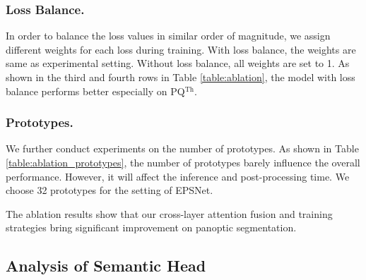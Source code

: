 \documentclass[runningheads]{llncs}
\begin{document}
\subsubsection{Loss Balance.}
In order to balance the loss values in similar order of magnitude, we assign different weights for each loss during training. With loss balance, the weights are same as experimental setting. Without loss balance, all weights are set to 1.  As shown in the third and fourth rows in Table \ref{table:ablation}, the model with loss balance performs better especially on PQ$^{\text{Th}}$.

\subsubsection{Prototypes.}
We further conduct experiments on the number of prototypes. As shown in Table \ref{table:ablation_prototypes}, the number of prototypes barely influence the overall performance. However, it will affect the inference and post-processing time. We choose 32 prototypes for the setting of EPSNet. 

The ablation results show that our cross-layer attention fusion and training strategies bring significant improvement on panoptic segmentation.










\subsection{Analysis of Semantic Head}
\end{document}
